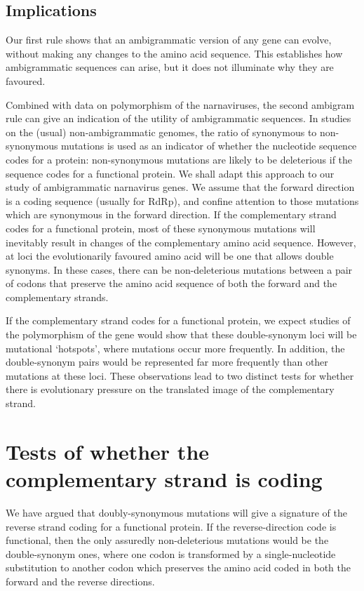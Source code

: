 \documentclass[9pt,lineno]{elife}
\newcommand{\MW}[1]{{\color{magenta}{#1}}}
\begin{document}
\subsection{Implications}
\label{sec: 2.3}

Our first rule shows that an ambigrammatic version of any gene can evolve, without 
making any changes to the amino acid sequence. This establishes how ambigrammatic sequences 
can arise, but it does not illuminate why they are favoured. 

Combined with data on polymorphism of the narnaviruses, the second ambigram rule can give an 
indication of the utility of ambigrammatic sequences. In studies on the (usual) non-ambigrammatic 
genomes, the ratio of synonymous to non-synonymous mutations is used as an indicator of 
whether the nucleotide sequence codes for a protein: non-synonymous mutations 
are likely to be deleterious if the sequence codes for a functional protein. 
We shall adapt this approach to our study of ambigrammatic narnavirus genes.
We assume that the forward direction is a coding sequence (usually for RdRp), 
and confine attention to those mutations which are synonymous in the forward 
direction. If the complementary strand codes for a functional protein, most of these 
synonymous mutations will inevitably result in changes of the complementary 
amino acid sequence. However, at \MW{many} loci the evolutionarily favoured amino acid 
will be one that allows double synonyms. In these cases, there can be 
non-deleterious mutations between a pair of codons that preserve the amino acid 
sequence of both the forward and the 
complementary strands.   

If the complementary strand codes for a functional protein, we expect studies of the 
polymorphism of the gene would show that these double-synonym loci will be 
mutational \lq hotspots', where mutations occur more frequently. In addition, the double-synonym pairs 
would be represented far more frequently than other mutations at these loci. These observations 
lead to two distinct tests for whether there is evolutionary pressure on the translated image of the 
complementary strand.

\section{Tests of whether the complementary strand is coding}
\label{sec: 3}

We have argued that doubly-synonymous mutations will give a signature of the 
reverse strand coding for a functional protein. If the reverse-direction code is functional, 
then the only assuredly non-deleterious mutations would be the double-synonym ones,
where one codon is transformed by a single-nucleotide substitution to another 
codon which preserves the amino acid coded in both the forward and 
the reverse directions. 
\end{document}
